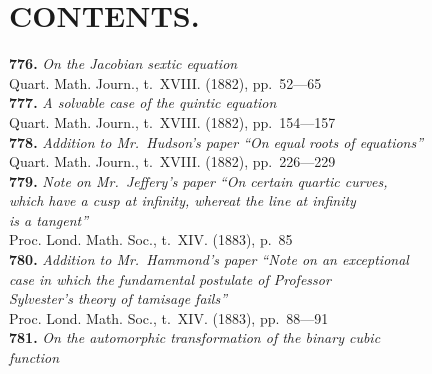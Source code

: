 \documentclass[12pt,a4paper,oneside]{book}
\theoremstyle{plain}
\theoremstyle{definition}
\theoremstyle{remark}
\begin{document}
\cleardoublepage

\chapter*{CONTENTS.}

\textbf{776.} \textit{On the Jacobian sextic equation} \\
\hspace*{2em}Quart. Math. Journ., t.~XVIII. (1882), pp.~52---65\\[0.3em]
\textbf{777.} \textit{A solvable case of the quintic equation} \\
\hspace*{2em}Quart. Math. Journ., t.~XVIII. (1882), pp.~154---157\\[0.3em]
\textbf{778.} \textit{Addition to Mr.~Hudson's paper ``On equal roots of equations''} \\
\hspace*{2em}Quart. Math. Journ., t.~XVIII. (1882), pp.~226---229\\[0.3em]
\textbf{779.} \textit{Note on Mr.~Jeffery's paper ``On certain quartic curves,}\\
\hspace*{2em}\textit{which have a cusp at infinity, whereat the line at infinity}\\
\hspace*{2em}\textit{is a tangent''} \\
\hspace*{2em}Proc. Lond. Math. Soc., t.~XIV. (1883), p.~85\\[0.3em]
\textbf{780.} \textit{Addition to Mr.~Hammond's paper ``Note on an exceptional}\\
\hspace*{2em}\textit{case in which the fundamental postulate of Professor}\\
\hspace*{2em}\textit{Sylvester's theory of tamisage fails''} \\
\hspace*{2em}Proc. Lond. Math. Soc., t.~XIV. (1883), pp.~88---91\\[0.3em]
\textbf{781.} \textit{On the automorphic transformation of the binary cubic}\\
\hspace*{2em}\textit{function} \\
\end{document}
